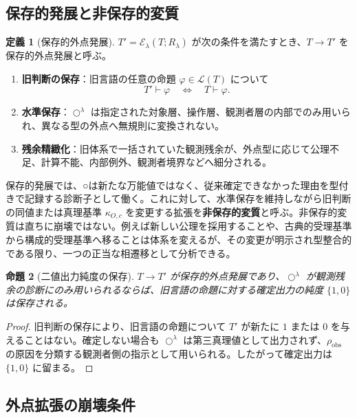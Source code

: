 \documentclass[a4paper,11pt]{ltjsarticle}
\theoremstyle{definition}
\newtheorem{definition}{定義}[section]
\theoremstyle{plain}
\newtheorem{proposition}[definition]{命題}
\newcommand{\Residual}{\rho_{\mathrm{obs}}}
\newcommand{\TruthCriterion}{\kappa}
\newcommand{\CircleExt}{\mathcal{E}}
\begin{document}
\subsection{保存的発展と非保存的変質}

\begin{definition}[保存的外点発展]
$T'=\CircleExt_\lambda(T;R_\lambda)$ が次の条件を満たすとき、$T\to T'$ を保存的外点発展と呼ぶ。
\begin{enumerate}
 \item \textbf{旧判断の保存}：旧言語の任意の命題 $\varphi\in\mathcal L(T)$ について
 \[
  T'\vdash\varphi
  \quad\Longleftrightarrow\quad
  T\vdash\varphi.
 \]
 \item \textbf{水準保存}：$\bigcirc^\lambda$ は指定された対象層、操作層、観測者層の内部でのみ用いられ、異なる型の外点へ無規則に変換されない。
 \item \textbf{残余精緻化}：旧体系で一括されていた観測残余が、外点型に応じて公理不足、計算不能、内部例外、観測者境界などへ細分される。
\end{enumerate}
\end{definition}

保存的発展では、○は新たな万能値ではなく、従来確定できなかった理由を型付きで記録する診断子として働く。これに対して、水準保存を維持しながら旧判断の同値または真理基準 $\TruthCriterion_{O,c}$ を変更する拡張を\textbf{非保存的変質}と呼ぶ。非保存的変質は直ちに崩壊ではない。例えば新しい公理を採用することや、古典的受理基準から構成的受理基準へ移ることは体系を変えるが、その変更が明示され型整合的である限り、一つの正当な相遷移として分析できる。

\begin{proposition}[二値出力純度の保存]
$T\to T'$ が保存的外点発展であり、$\bigcirc^\lambda$ が観測残余の診断にのみ用いられるならば、旧言語の命題に対する確定出力の純度 $\{1,0\}$ は保存される。
\end{proposition}

\begin{proof}
旧判断の保存により、旧言語の命題について $T'$ が新たに $1$ または $0$ を与えることはない。確定しない場合も $\bigcirc^\lambda$ は第三真理値として出力されず、$\Residual$ の原因を分類する観測者側の指示として用いられる。したがって確定出力は $\{1,0\}$ に留まる。
\end{proof}

\subsection{外点拡張の崩壊条件}
\end{document}
